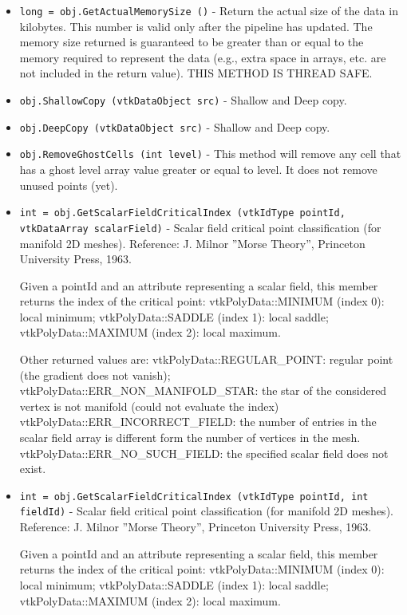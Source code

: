 \begin{itemize}
\item  \verb|long = obj.GetActualMemorySize ()| -  Return the actual size of the data in kilobytes. This number
 is valid only after the pipeline has updated. The memory size
 returned is guaranteed to be greater than or equal to the
 memory required to represent the data (e.g., extra space in
 arrays, etc. are not included in the return value). THIS METHOD
 IS THREAD SAFE.

\item  \verb|obj.ShallowCopy (vtkDataObject src)| -  Shallow and Deep copy.

\item  \verb|obj.DeepCopy (vtkDataObject src)| -  Shallow and Deep copy.

\item  \verb|obj.RemoveGhostCells (int level)| -  This method will remove any cell that has a ghost level array value
 greater or equal to level.  It does not remove unused points (yet).

\item  \verb|int = obj.GetScalarFieldCriticalIndex (vtkIdType pointId, vtkDataArray scalarField)| -  Scalar field critical point classification (for manifold 2D meshes).
 Reference: J. Milnor ''Morse Theory'', Princeton University Press, 1963.
     
 Given a pointId and an attribute representing a scalar field, this member 
 returns the index of the critical point:
 vtkPolyData::MINIMUM (index 0): local minimum;
 vtkPolyData::SADDLE  (index 1): local saddle;
 vtkPolyData::MAXIMUM (index 2): local maximum.

 Other returned values are:
 vtkPolyData::REGULAR\_POINT: regular point (the gradient does not vanish);
 vtkPolyData::ERR\_NON\_MANIFOLD\_STAR: the star of the considered vertex is
 not manifold (could not evaluate the index)
 vtkPolyData::ERR\_INCORRECT\_FIELD: the number of entries in the scalar field
 array is different form the number of vertices in the mesh.
 vtkPolyData::ERR\_NO\_SUCH\_FIELD: the specified scalar field does not exist.

\item  \verb|int = obj.GetScalarFieldCriticalIndex (vtkIdType pointId, int fieldId)| -  Scalar field critical point classification (for manifold 2D meshes).
 Reference: J. Milnor ''Morse Theory'', Princeton University Press, 1963.
     
 Given a pointId and an attribute representing a scalar field, this member 
 returns the index of the critical point:
 vtkPolyData::MINIMUM (index 0): local minimum;
 vtkPolyData::SADDLE  (index 1): local saddle;
 vtkPolyData::MAXIMUM (index 2): local maximum.


\end{itemize}
